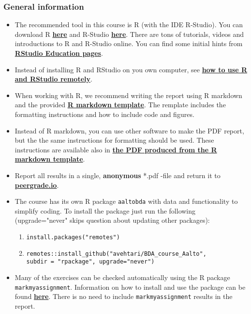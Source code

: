 
\subsubsection*{General information}


\begin{itemize}
\itemsep0em
\item The recommended tool in this course is R (with the IDE R-Studio). You can download R \href{https://cran.r-project.org/}{\textbf{here}} and R-Studio \href{https://www.rstudio.com/products/rstudio/download/}{\textbf{here}}. There are tons of tutorials, videos and introductions to R and R-Studio online. You can find some initial hints from \href{https://education.rstudio.com/}{\textbf{RStudio Education pages}}.
\item Instead of installing R and RStudio on you own computer, see \href{https://avehtari.github.io/BDA_course_Aalto/FAQ.html#How_to_use_R_and_RStudio_remotely}{\textbf{how to use R and RStudio remotely}}.
\item When working with R, we recommend writing the report using R markdown and the provided \href{https://raw.githubusercontent.com/avehtari/BDA_course_Aalto/master/templates/assignment_template.rmd}{\textbf{R markdown template}}. The remplate includes the formatting instructions and how to include code and figures.
\item Instead of R markdown, you can use other software to make the PDF report, but the the same instructions for formatting should be used. These instructions are available also in \href{https://raw.githubusercontent.com/avehtari/BDA_course_Aalto/master/templates/assignment_template.pdf}{\textbf{the PDF produced from the R markdown template}}.
\item  Report all results in a single, {\bf anonymous} *.pdf -file and return it to \href{peergrade.io}{\textbf{peergrade.io}}.
\item The course has its own R package \texttt{aaltobda} with data and functionality to simplify coding. To install the package just run the following (upgrade="never" skips question about updating other packages):
\begin{enumerate}
\item \texttt{install.packages("remotes")}
\item \texttt{remotes::install\_github("avehtari/BDA\_course\_Aalto", \\ subdir = "rpackage", upgrade="never")}
\end{enumerate}
\item Many of the exercises can be checked automatically using the R package \\ \texttt{markmyassignment}. Information on how to install and use the package can be found \href{https://cran.r-project.org/web/packages/markmyassignment/vignettes/markmyassignment.html}{\textbf{here}}. There is no need to include \texttt{markmyassignment} results in the report.

\end{itemize}
